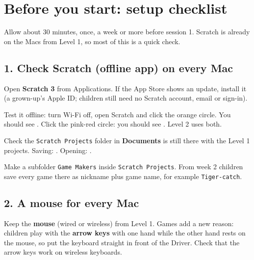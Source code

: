 \documentclass[track=junior,level=2,teacher]{kidscode}
\begin{document}
\section{Before you start: setup checklist}
Allow about 30 minutes, once, a week or more before session 1. Scratch is already on the Macs from
Level 1, so most of this is a quick check.

\subsection{1. Check Scratch (offline app) on every Mac}
\begin{checklist}
  \item Open \textbf{Scratch 3} from Applications. If the App Store shows an update, install it
        (a grown-up's Apple ID; children still need no Scratch account, email or sign-in).
  \item Test it offline: turn Wi-Fi off, open Scratch and click the orange  circle.
        You should see . Click the pink-red  circle: you should
        see . Level 2 uses both.
  \item Check the \texttt{Scratch Projects} folder in \textbf{Documents} is still there with the Level 1
        projects. Saving: . Opening: .
  \item Make a subfolder \texttt{Game Makers} inside \texttt{Scratch Projects}. From week 2 children
        save every game there as nickname plus game name, for example \texttt{Tiger-catch}.
\end{checklist}

\subsection{2. A mouse for every Mac}
Keep the \textbf{mouse} (wired or wireless) from Level 1. Games add a new reason: children play with
the \textbf{arrow keys} with one hand while the other hand rests on the mouse, so put the keyboard
straight in front of the Driver. Check that the arrow keys work on wireless keyboards.
\end{document}
